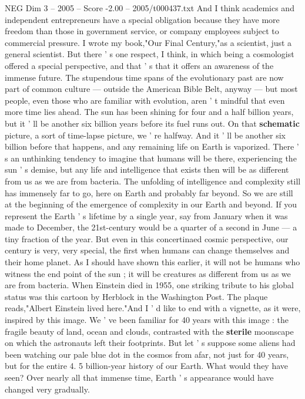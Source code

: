 \begin{textsample}{NEG Dim 3 – 2005 – Score -2.00 – 2005/t000437.txt}
And I think academics and independent entrepreneurs have a special obligation because they have more freedom than those in government service, or company employees subject to commercial pressure.
I wrote my book,"Our Final Century,"as a scientist, just a general scientist.
But there ' s one respect, I think, in which being a cosmologist offered a special perspective, and that ' s that it offers an awareness of the immense future.
The stupendous time spans of the evolutionary past are now part of common culture — outside the American Bible Belt, anyway — but most people, even those who are familiar with evolution, aren ' t mindful that even more time lies ahead.
The sun has been shining for four and a half billion years, but it ' ll be another six billion years before its fuel runs out.
On that \textbf{schematic} picture, a sort of time-lapse picture, we ' re halfway.
And it ' ll be another six billion before that happens, and any remaining life on Earth is vaporized.
There ' s an unthinking tendency to imagine that humans will be there, experiencing the sun ' s demise, but any life and intelligence that exists then will be as different from us as we are from bacteria.
The unfolding of intelligence and complexity still has immensely far to go, here on Earth and probably far beyond.
So we are still at the beginning of the emergence of complexity in our Earth and beyond.
If you represent the Earth ' s lifetime by a single year, say from January when it was made to December, the 21st-century would be a quarter of a second in June — a tiny fraction of the year.
But even in this concertinaed cosmic perspective, our century is very, very special, the first when humans can change themselves and their home planet.
As I should have shown this earlier, it will not be humans who witness the end point of the sun ; it will be creatures as different from us as we are from bacteria.
When Einstein died in 1955, one striking tribute to his global status was this cartoon by Herblock in the Washington Post.
The plaque reads,"Albert Einstein lived here."And I ' d like to end with a vignette, as it were, inspired by this image.
We ' ve been familiar for 40 years with this image : the fragile beauty of land, ocean and clouds, contrasted with the \textbf{sterile} moonscape on which the astronauts left their footprints.
But let ' s suppose some aliens had been watching our pale blue dot in the cosmos from afar, not just for 40 years, but for the entire 4. 5 billion-year history of our Earth.
What would they have seen?
Over nearly all that immense time, Earth ' s appearance would have changed very gradually.

\end{textsample}
